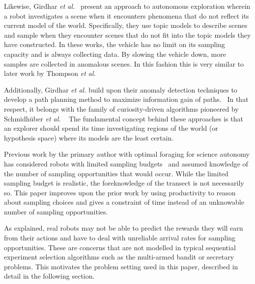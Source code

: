 Likewise, Girdhar \emph{et al.}~\cite{girdhar2013autonomous} present an approach to autonomous exploration wherein a robot
investigates a scene when it encounters phenomena that do not reflect its
current model of the world.  Specifically, they use topic models to describe
scenes and sample when they encounter scenes that do not fit into the topic models
they have constructed.  In these works, the vehicle has no limit on its sampling
capacity and is always collecting data.  By slowing the vehicle down, more
samples are collected in anomalous scenes.  In this fashion this is very
similar to later work by Thompson \emph{et al.}~\cite{thompson2013adaptive}

Additionally, Girdhar \emph{et al.} build upon their anomaly detection techniques to develop a path planning method to maximize
information gain of paths.~\cite{girdhar2014curiosity}  In that respect, it
belongs with the family of curiosity-driven algorithms pioneered by
Schmidh{\"u}ber \emph{et al.}
~\cite{sun2011planning}  The fundamental concept behind these approaches is
that an explorer should spend its time investigating regions of the world (or
hypothesis space) where its models are the least certain.


Previous work by the primary author with optimal foraging for science autonomy has considered robots with limited sampling budgets~\cite{furlong2014budgeting} and assumed knowledge of the number of sampling opportunities that would occur.  While the limited sampling budget is realistic, the foreknowledge of the transect is not necessarily so.  This paper improves upon the prior work by using productivity to reason about sampling choices and gives a constraint of time instead of an unknowable number of sampling opportunities.


As explained, real robots may not be able to predict the rewards they will earn from their actions and have to deal with unreliable arrival rates for sampling opportunities.  These are concerns that are not modelled in typical sequential experiment selection algorithms such as the multi-armed bandit or secretary problems.  This motivates the problem setting used in this paper, described in detail in the following section.

